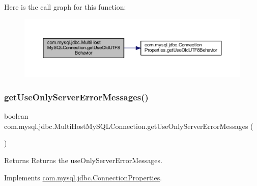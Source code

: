 Here is the call graph for this function\+:
\nopagebreak
\begin{figure}[H]
\begin{center}
\leavevmode
\includegraphics[width=350pt]{classcom_1_1mysql_1_1jdbc_1_1_multi_host_my_s_q_l_connection_a36f0772c382523e46208fde9a19ae456_cgraph}
\end{center}
\end{figure}
\mbox{\label{classcom_1_1mysql_1_1jdbc_1_1_multi_host_my_s_q_l_connection_a705ba324a046fb764066a5db3e967c47}} 
\subsubsection{\texorpdfstring{get\+Use\+Only\+Server\+Error\+Messages()}{getUseOnlyServerErrorMessages()}}
{\footnotesize\ttfamily boolean com.\+mysql.\+jdbc.\+Multi\+Host\+My\+S\+Q\+L\+Connection.\+get\+Use\+Only\+Server\+Error\+Messages (\begin{DoxyParamCaption}{ }\end{DoxyParamCaption})}

\begin{DoxyReturn}{Returns}
Returns the use\+Only\+Server\+Error\+Messages. 
\end{DoxyReturn}


Implements \mbox{\hyperlink{interfacecom_1_1mysql_1_1jdbc_1_1_connection_properties_ae8e53bc10eb54dfdc635c30ff5efca90}{com.\+mysql.\+jdbc.\+Connection\+Properties}}.

